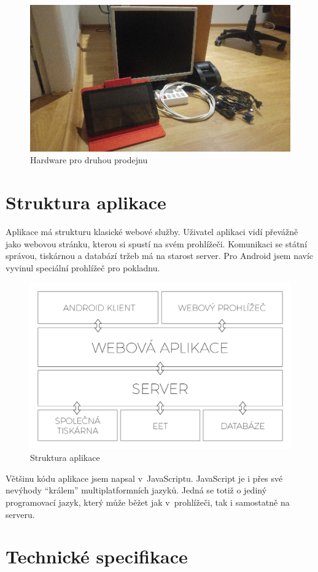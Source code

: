 \documentclass[a4paper,11pt,oneside]{article}
\begin{document}
\begin{figure}[H]
	\centering
	\includegraphics[width=0.7\linewidth]{../hardware}
	\caption{Hardware pro druhou prodejnu}
	\label{fig:hardware}
\end{figure}

\section{Struktura aplikace}
\label{sec:struktura}
Aplikace má strukturu klasické webové služby. Uživatel aplikaci vidí převážně jako webovou stránku, kterou si spustí na svém prohlížeči. Komunikaci se státní správou, tiskárnou a databází tržeb má na starost server. Pro Android jsem navíc vyvinul speciální prohlížeč pro pokladnu. 

\begin{figure}[H]
	\centering
	\includegraphics[width=0.65\linewidth]{../stack}
	\caption{Struktura aplikace}
	\label{fig:stack}
\end{figure}

Většinu kódu aplikace jsem napsal v~JavaScriptu. JavaScript je i přes své nevýhody \enquote{králem} multiplatformních jazyků. Jedná se totiž o jediný programovací jazyk, který může běžet jak v~prohlížeči, tak i samostatně na serveru.

\section{Technické specifikace}
\end{document}
